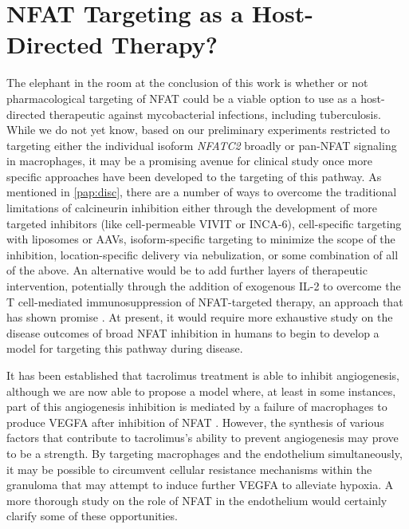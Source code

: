 \section{NFAT Targeting as a Host\hyp{}Directed Therapy?}\label{nfathdt}

The elephant in the room at the conclusion of this work is whether or not pharmacological targeting of NFAT could be a viable option to use as a host\hyp{}directed therapeutic against mycobacterial infections, including tuberculosis. While we do not yet know, based on our preliminary experiments restricted to targeting either the individual isoform \textit{NFATC2} broadly or pan\hyp{}NFAT signaling in macrophages, it may be a promising avenue for clinical study once more specific approaches have been developed to the targeting of this pathway. As mentioned in \autoref{pap:disc}, there are a number of ways to overcome the traditional limitations of calcineurin inhibition either through the development of more targeted inhibitors (like cell\hyp{}permeable VIVIT or INCA\hyp{}6), cell\hyp{}specific targeting with liposomes or AAVs, isoform\hyp{}specific targeting to minimize the scope of the inhibition, location\hyp{}specific delivery via nebulization, or some combination of all of the above. An alternative would be to add further layers of therapeutic intervention, potentially through the addition of exogenous IL\hyp{}2 to overcome the T cell\hyp{}mediated immunosuppression of NFAT\hyp{}targeted therapy, an approach that has shown promise \citep{Whitehouse2017}. At present, it would require more exhaustive study on the disease outcomes of broad NFAT inhibition in humans to begin to develop a model for targeting this pathway during disease.

It has been established that tacrolimus treatment is able to inhibit angiogenesis, although we are now able to propose a model where, at least in some instances, part of this angiogenesis inhibition is mediated by a failure of macrophages to produce VEGFA after inhibition of NFAT \citep{Shen2022, Turgut2011}. However, the synthesis of various factors that contribute to tacrolimus's ability to prevent angiogenesis may prove to be a strength. By targeting macrophages and the endothelium simultaneously, it may be possible to circumvent cellular resistance mechanisms within the granuloma that may attempt to induce further VEGFA to alleviate hypoxia. A more thorough study on the role of NFAT in the endothelium would certainly clarify some of these opportunities. 

